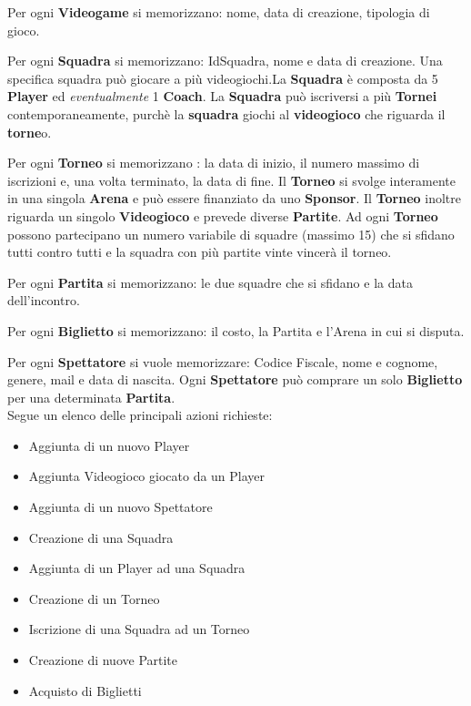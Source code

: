 \documentclass[a4paper,12pt]{report}
\begin{document}
Per ogni \textbf{Videogame} si memorizzano: nome, data di creazione, tipologia di gioco.

Per ogni \textbf{Squadra} si memorizzano: IdSquadra, nome e data di creazione. Una specifica squadra può giocare a più videogiochi.La \textbf{Squadra} è composta da 5 \textbf{Player} ed \textit{eventualmente} 1 \textbf{Coach}. La \textbf{Squadra} può iscriversi a più \textbf{Tornei} contemporaneamente, purchè la \textbf{squadra} giochi al \textbf{videogioco} che riguarda il \textbf{torne}o.

Per ogni \textbf{Torneo} si memorizzano : la data di inizio, il numero massimo di iscrizioni e, una  volta terminato, la data di fine. Il \textbf{Torneo} si svolge interamente in una singola \textbf{Arena} e può essere finanziato da uno \textbf{Sponsor}. Il \textbf{Torneo} inoltre riguarda un singolo \textbf{Videogioco} e prevede diverse \textbf{Partite}. Ad ogni \textbf{Torneo} possono partecipano un numero variabile di squadre (massimo 15) che si sfidano tutti contro tutti e la squadra con più partite vinte vincerà il torneo.

Per ogni \textbf{Partita} si memorizzano: le due squadre che si sfidano e la data dell'incontro.

Per ogni \textbf{Biglietto} si memorizzano: il costo, la Partita e l'Arena in cui si disputa.

Per ogni \textbf{Spettatore} si vuole memorizzare: Codice Fiscale, nome e cognome, genere, mail e data di nascita. Ogni \textbf{Spettatore} può comprare un solo \textbf{Biglietto} per una determinata \textbf{Partita}.\\

Segue un elenco delle principali azioni richieste:
\begin{itemize}
	\setlength\itemsep{0.1em}
	\item Aggiunta di un nuovo Player
	\item Aggiunta Videogioco giocato da un Player
	\item Aggiunta di un nuovo Spettatore
	\item Creazione di una Squadra
	\item Aggiunta di un Player ad una Squadra
	\item Creazione di un Torneo
	\item Iscrizione di una Squadra ad un Torneo
	\item Creazione di nuove Partite
	\item Acquisto di Biglietti
\end{itemize}
\end{document}
